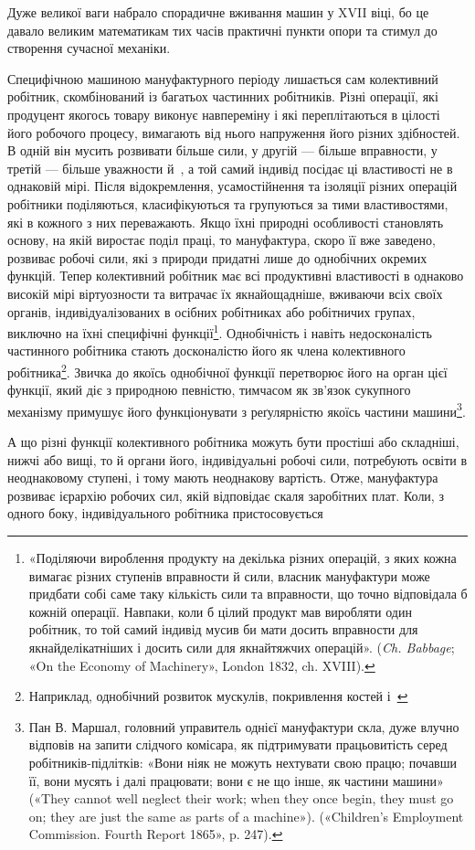 \parcont{}  %
Дуже великої ваги набрало спорадичне вживання машин у
XVII віці, бо це давало великим математикам тих часів практичні
пункти опори та стимул до створення сучасної механіки.

Специфічною машиною мануфактурного періоду лишається
сам колективний робітник, скомбінований із багатьох частинних
робітників. Різні операції, які продуцент якогось товару виконує
навпереміну і які переплітаються в цілості його робочого процесу,
вимагають від нього напруження його різних здібностей.
В одній він мусить розвивати більше сили, у другій — більше
вправности, у третій — більше уважности й~, а той самий
індивід посідає ці властивості не в однаковій мірі. Після відокремлення,
усамостійнення та ізоляції різних операцій робітники
поділяються, класифікуються та групуються за тими властивостями,
які в кожного з них переважають. Якщо їхні природні
особливості становлять основу, на якій виростає поділ праці,
то мануфактура, скоро її вже заведено, розвиває робочі сили, які
з природи придатні лише до однобічних окремих функцій. Тепер
колективний робітник має всі продуктивні властивості в однаково
високій мірі віртуозности та витрачає їх якнайощадніше, вживаючи
всіх своїх органів, індивідуалізованих в осібних робітниках
або робітничих групах, виключно на їхні специфічні функції\footnote{
«Поділяючи вироблення продукту на декілька різних операцій,
з яких кожна вимагає різних ступенів вправности й сили, власник мануфактури
може придбати собі саме таку кількість сили та вправности,
що точно відповідала б кожній операції. Навпаки, коли б цілий продукт
мав виробляти один робітник, то той самий індивід мусив би мати досить
вправности для якнайделікатніших і досить сили для якнайтяжчих
операцій». (\emph{Ch. Babbage}; «On the Economy of Machinery», London 1832,
ch. XVIII).
}. Однобічність і навіть недосконалість частинного робітника стають
досконалістю його як члена колективного робітника\footnote{
Наприклад, однобічний розвиток мускулів, покривлення костей
і~
}. Звичка до якоїсь однобічної функції перетворює його на орган цієї
функції, який діє з природною певністю, тимчасом як зв’язок
сукупного механізму примушує його функціонувати з реґулярністю
якоїсь частини машини\footnote{
Пан В. Маршал, головний управитель однієї мануфактури скла,
дуже влучно відповів на запити слідчого комісара, як підтримувати
працьовитість серед робітників-підлітків: «Вони ніяк не можуть нехтувати
свою працю; почавши її, вони мусять і далі працювати; вони
є не що інше, як частини машини» («They cannot well neglect their work;
when they once begin, they must go on; they are just the same as parts of
a machine»). («Children’s Employment Commission. Fourth Report 1865»,
p. 247).
}.

А що різні функції колективного робітника можуть бути
простіші або складніші, нижчі або вищі, то й органи його, індивідуальні
робочі сили, потребують освіти в неоднаковому ступені,
і тому мають неоднакову вартість. Отже, мануфактура розвиває
ієрархію робочих сил, якій відповідає скаля заробітних плат.
Коли, з одного боку, індивідуального робітника пристосовується
\parbreak{}  %
